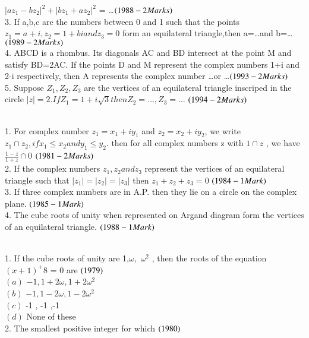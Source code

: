 \documentclass[journal,12pt,twocolumn]{IEEEtran}
\theoremstyle{remark}
\begin{document}
$|az_1-bz_2|^2+|bz_1+az_2|^2$ = \ldots  $\hfill(1988 - 2 Marks)$\\
3.  If a,b,c are the numbers between 0 and 1 such that the points $z_1=a+i, z_2=1+bi andz_3=0$ form an equilateral triangle,then a=\ldots and b=\ldots  $\hfill(1989 - 2 Marks)$\\
4.  ABCD is a rhombus. Its diagonals AC and BD intersect at the point M and satisfy BD=2AC. If the points D and M represent the complex numbers 1+i and 2-i respectively, then A represents the complex number \ldots or \ldots $\hfill(1993 - 2 Marks)$\\
5.  Suppose $Z_1,Z_2,Z_3$ are the vertices of an equilateral triangle inscriped in the circle $|z|=2.If Z_1=1+i\sqrt{3}     then Z_2=\ldots,Z_3=\ldots$ $\hfill(1994 - 2 Marks)$\\
\\
1.  For complex number $z_1=x_1+iy_1 $ and $z_2=x_2+iy_2$, we write $z_1\cap z_2, ifx_1\leq x_2 and y_1\leq y_2. $ then for all complex numbers z with $1\cap z$ , we have $\frac{1-z}{1+z} \cap 0$  $\hfill(1981 - 2 Marks)$\\
2.  If the complex numbers $z_1,z_2  and z_3 $ represent the vertices of an equilateral triangle such that $ |z_1| = |z_2| =|z_3| $ then $z_1+z_2+z_3 = 0$ $\hfill(1984 - 1 Mark)$\\
3.  If three complex numbers are in A.P. then they lie on a circle on the complex plane. $\hfill(1985 - 1 Mark)$\\
4.  The cube roots of unity when represented on Argand diagram form the vertices of an equilateral triangle. $\hfill(1988 - 1 Mark)$\\
\\
1.  If the cube roots of unity are 1,$\omega , $ $\omega^2$ , then the roots of the equation $(x+1)^+8$ = 0 are $\hfill(1979)$\\
$(a)$  $-1 , 1+2\omega ,1+2\omega^2 $\\
$(b)$  $-1  , 1-2\omega , 1-2\omega^2$\\
$(c)$  -1 , -1 ,-1 \\
$(d)$   None of these\\
2.  The smallest positive integer for which $\hfill(1980)$ \\
\end{document}
